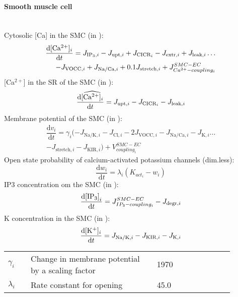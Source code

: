 \paragraph{Smooth muscle cell}~\\
%
Cytosolic [\gls{Ca}] in the \gls{SMC} (in \uM):
\begin{equation}\label{eq:ci}
\begin{split}
\dfrac{\mathrm{d}\text{[Ca$^{2+}$]$_i$}}{\mathrm{d}t} = J_{\text{IP}_3,i} - J_{\text{upt},i} + J_{\text{CICR}_i} - J_{\text{extr},i} +  J_{\text{leak},i}\dots \\
 - J_{\text{VOCC},i} + J_{\text{Na/Ca},i}  + 0.1J_{\text{stretch},i} + J_{Ca^{2+}-coupling_{i}}^{SMC-EC}
\end{split} 
\end{equation}
%
[Ca$^{2+}$] in the \gls{SR} of the \gls{SMC} (in \uM):
\begin{equation} \label{eq:si}
\dfrac{\mathrm{d}\widehat{\text{[Ca$^{2+}$]$_i$}}}{\mathrm{d}t} =  J_{\text{upt},i} - J_{\text{CICR}_i} - J_{\text{leak},i}
\end{equation}
%
Membrane potential of the \gls{SMC} (in \mV):
\begin{equation} \label{eq:vi}
\begin{split}
\dfrac{\mathrm{d}v_{i}}{\mathrm{d}t} = \gamma_{i}( -J_{\text{Na/K},i} - J_{\text{Cl},i} - 2J_{\text{VOCC},i}- J_{\text{Na/Ca},i} - J_{\text{K},i} \dots \\
- J_{\text{stretch},i} - J_{\text{KIR},i} ) +V^{SMC-EC}_{coupling_{i}}
\end{split}
\end{equation}
%
Open state probability of calcium-activated potassium channels (dim.less):
\begin{equation} \label{eq:dwidt}
\dfrac{\mathrm{d}w_{i}}{\mathrm{d}t} =  \lambda_{i} \left( K_{act_{i}} - w_{i} \right)
\end{equation}
%
\gls{IP3} concentration om the \gls{SMC} (in \uM):
\begin{equation} \label{eq:dIidt}
\dfrac{\mathrm{d}\text{[IP$_3$]} _{i}}{\mathrm{d}t} = J^{SMC-EC}_{IP_{3}-coupling_{i}} - J_{\text{degr},i}
\end{equation}
%
\gls{K} concentration in the \gls{SMC} (in \uM):
\begin{equation} \label{eq:dkidt}
\dfrac{\mathrm{d} [\text{K$^+$}]_i}{\mathrm{d}t}  = J_{\text{Na/K},i}  - J_{\text{KIR},i} - J_{\text{K},i}
\end{equation}

\begin{table}[h!]
\centering
\begin{tabular}{ p{0.09\linewidth}  >{\footnotesize} p{0.5\linewidth}  >{\footnotesize} p{0.27\linewidth} >{\footnotesize} p{0.03\linewidth} }
\hline
$\gamma_{i}$				& Change in membrane potential by a scaling factor					& 1970 \mVpuM	& \cite{Koenigsberger2006} \\
$\lambda_{i} $				& Rate constant for opening											& 45.0 \pers 	& \cite{Koenigsberger2006} \\
\hline
\end{tabular}
\label{tab:dcidt}
\end{table}

